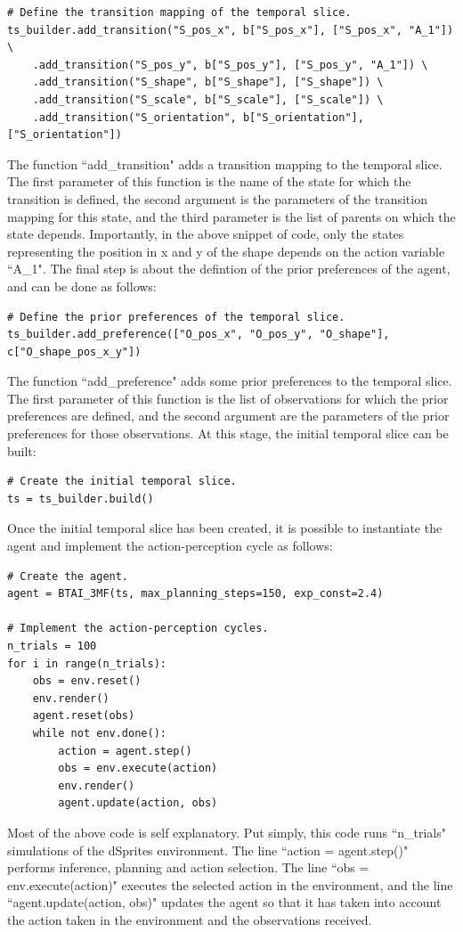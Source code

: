 \documentclass[twoside,11pt]{article}
\begin{document}
\begin{verbatim}
# Define the transition mapping of the temporal slice.
ts_builder.add_transition("S_pos_x", b["S_pos_x"], ["S_pos_x", "A_1"]) \
    .add_transition("S_pos_y", b["S_pos_y"], ["S_pos_y", "A_1"]) \
    .add_transition("S_shape", b["S_shape"], ["S_shape"]) \
    .add_transition("S_scale", b["S_scale"], ["S_scale"]) \
    .add_transition("S_orientation", b["S_orientation"], ["S_orientation"])
\end{verbatim}
The function ``add\_transition" adds a transition mapping to the temporal slice. The first parameter of this function is the name of the state for which the transition is defined, the second argument is the parameters of the transition mapping for this state, and the third parameter is the list of parents on which the state depends. Importantly, in the above snippet of code, only the states representing the position in x and y of the shape depends on the action variable ``A\_1". The final step is about the defintion of the prior preferences of the agent, and can be done as follows:
\begin{verbatim}
# Define the prior preferences of the temporal slice.
ts_builder.add_preference(["O_pos_x", "O_pos_y", "O_shape"], c["O_shape_pos_x_y"])
\end{verbatim}
The function ``add\_preference" adds some prior preferences to the temporal slice. The first parameter of this function is the list of observations for which the prior preferences are defined, and the second argument are the parameters of the prior preferences for those observations. At this stage, the initial temporal slice can be built:
\begin{verbatim}
# Create the initial temporal slice.
ts = ts_builder.build()
\end{verbatim}
Once the initial temporal slice has been created, it is possible to instantiate the agent and implement the action-perception cycle as follows: 
\begin{verbatim}
# Create the agent.
agent = BTAI_3MF(ts, max_planning_steps=150, exp_const=2.4)

# Implement the action-perception cycles.
n_trials = 100
for i in range(n_trials):
    obs = env.reset()
    env.render()
    agent.reset(obs)
    while not env.done():
        action = agent.step()
        obs = env.execute(action)
        env.render()
        agent.update(action, obs)
\end{verbatim}
Most of the above code is self explanatory. Put simply, this code runs ``n\_trials" simulations of the dSprites environment. The line ``action = agent.step()" performs inference, planning and action selection. The line ``obs = env.execute(action)" executes the selected action in the environment, and the line ``agent.update(action, obs)" updates the agent so that it has taken into account the action taken in the environment and the observations received.
\end{document}

